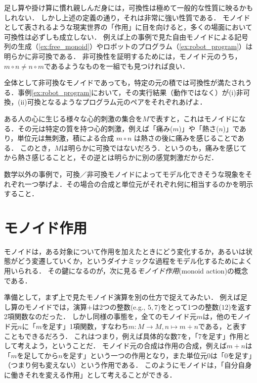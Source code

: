 \documentclass[11pt,a4paper, dvipdfmx]{jsarticle}
\begin{document}
足し算や掛け算に慣れ親しんだ身には，可換性は極めて一般的な性質に映るかもしれない．
しかし上述の定義の通り，それは非常に強い性質である．
モノイドとして表されるような現実世界の「作用」に目を向けると，多くの場面において可換性は必ずしも成立しない．
例えば上の事例で見た自由モノイドによる記号列の生成（\ref{ex:free_monoid}）やロボットのプログラム（\ref{ex:robot_program}）は明らかに非可換である．
非可換性を証明するためには，モノイド元のうち，$m \circ n \neq n \circ m$であるようなものを一組でも見つければ良い．

\begin{exercise}
 全体として非可換なモノイドであっても，特定の元の積では可換性が満たされうる．事例\ref{ex:robot_program}において，その実行結果（動作ではなく）が(i)非可換，(ii)可換となるようなプログラム元のペアをそれぞれあげよ．
\end{exercise}


\begin{example}
    ある人の心に生じる様々な心的刺激の集合を$M$で表すと，これはモノイドになる．その元は特定の質を持つ心的刺激，例えば「痛み($m$)」や「熱さ($n$)」であり，単位元は無刺激，積による合成 $m \circ n$ は熱さの後に痛みを感じることである．
    このとき，$M$は明らかに可換ではないだろう．というのも，痛みを感じてから熱さ感じることと，その逆とは明らかに別の感覚刺激だからだ．
\end{example}

\begin{exercise}    数学以外の事例で，可換／非可換モノイドによってモデル化できそうな現象をそれぞれ一つ挙げよ．その場合の合成と単位元がそれぞれ何に相当するのかを明示すること．
\end{exercise}    



\section{モノイド作用}
モノイドは，ある対象について作用を加えたときにどう変化するか，あるいは状態がどう変遷していくか，というダイナミックな過程をモデル化するためによく用いられる．
その鍵になるのが，次に見る\emph{モノイド作用}(monoid action)の概念である．

準備として，まず上で見たモノイド演算を別の仕方で捉えてみたい．
例えば足し算のモノイドでは，演算$+$は2つの整数(e.g., $5, 7$)をとって1つの整数($12$)を返す2項関数なのだった．
しかし同様の事態を，全てのモノイド元$m$は，他のモノイド元$n$に「$m$を足す」1項関数，すなわち$m:M \to M, n \mapsto m+n$である，と表すこともできるだろう．
これはつまり，例えば具体的な数7を，「7を足す」作用として考えよう，ということだ．
モノイド元の合成は作用の合成，例えば$m+n$は「$m$を足してから$n$を足す」という一つの作用となり，また単位元$0$は「$0$を足す」（つまり何も変えない）という作用である．
このようにモノイドは，「自分自身に働きそれを変える作用」として考えることができる．
\end{document}
